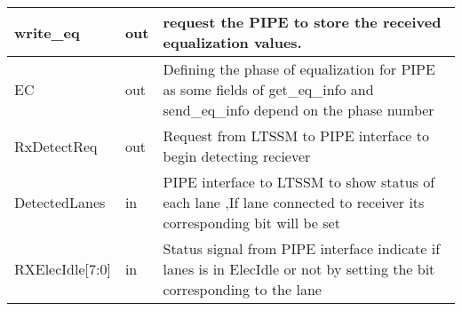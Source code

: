 \begin{table}[H]
\begin{tabular}{ |P{26mm}|P{10mm}|m{60mm}|  }
write\_eq & out & request the PIPE to store the received equalization values. \\ \hline

EC & out & Defining the phase of equalization for PIPE as some fields of get\_eq\_info and send\_eq\_info  depend on the phase number \\
\hline



RxDetectReq & out & Request from LTSSM to PIPE interface to begin detecting reciever  \\ \hline

DetectedLanes \newline [7:0] & in & PIPE interface to LTSSM to show status of each lane ,If lane connected to receiver its corresponding bit will be set \\ \hline 

RXElecIdle[7:0] & in & Status signal from PIPE interface indicate if lanes is in ElecIdle or not by setting the bit corresponding to the lane \\ \hline
\end{tabular}
\end{table}


